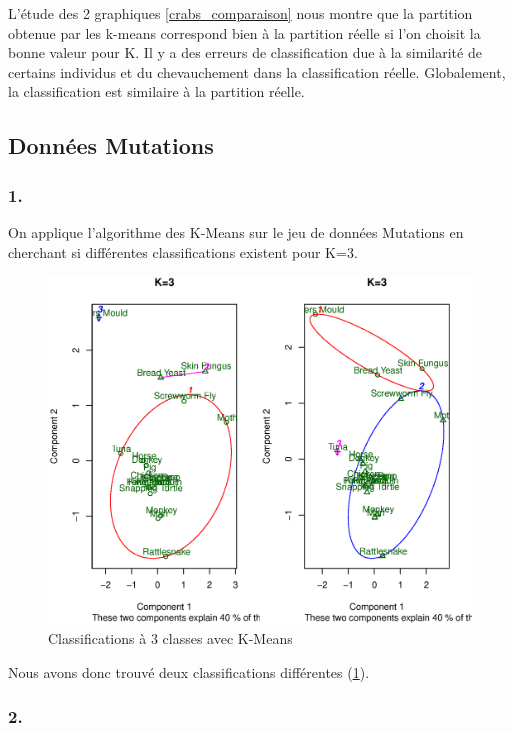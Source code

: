 \documentclass{article}
\begin{document}
L'étude des 2 graphiques \ref{crabs_comparaison} nous montre que la partition obtenue par les k-means correspond bien à la partition réelle si l'on choisit la bonne valeur pour K. Il y a des erreurs de classification due à la similarité de certains individus et du chevauchement dans la classification réelle. Globalement, la classification est similaire à la partition réelle.


\subsection{Données Mutations}

\subsubsection*{1.}

On applique l'algorithme des K-Means sur le jeu de données Mutations en cherchant si différentes classifications existent pour K=3.

\begin{figure}[H]
\centering
\includegraphics[scale=0.5]{./img/mut_clusplot_aftd_comp.eps}
\caption{Classifications à 3 classes avec K-Means}
\label{mut_clusplot_aftd-comp}
\end{figure}

Nous avons donc trouvé deux classifications différentes (\ref{mut_clusplot_aftd-comp}).

\subsubsection*{2.}
\end{document}

